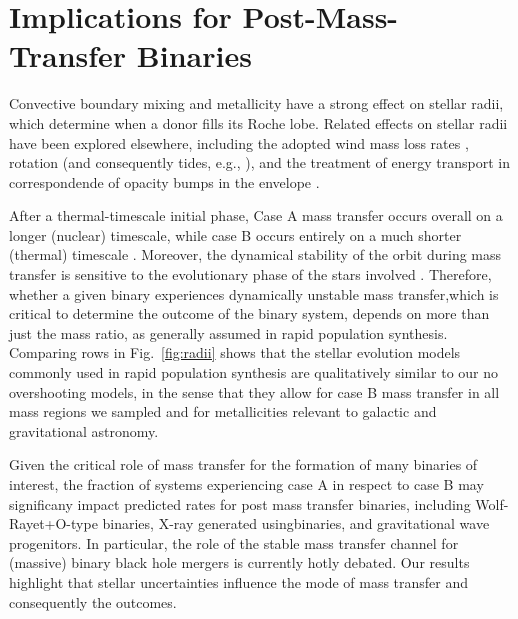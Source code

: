 \documentclass[twocolumn]{aastex63}
\DeclareRobustCommand{\Figref}[1]{Fig.~\ref{#1}}
\begin{document}
\section{Implications for Post-Mass-Transfer Binaries}

Convective boundary mixing \citep{brott:11, johnston:24} and
metallicity have a strong effect on stellar radii, which determine
when a donor fills its Roche lobe. Related effects on stellar radii have
been explored elsewhere, including the adopted wind mass loss rates
\citep[e.g.,][]{smith:14, renzo:17, josiek:24}, rotation (and
consequently tides, e.g., \citealt{maeder:00}), and the treatment of energy transport
in correspondende of opacity bumps in the envelope
\citep[e.g.,][]{joss:73, agrawal:22, cheng:24}.

After a thermal-timescale initial phase, Case A mass transfer occurs
overall on a longer (nuclear) timescale, while case B occurs entirely
on a much shorter (thermal) timescale \citep[but see][]{klencki:22}.
Moreover, the dynamical stability of the orbit during mass transfer is
sensitive to the evolutionary phase of the stars involved
\citep[e.g.,][]{claeys:14}. Therefore, whether a given binary
experiences dynamically unstable mass transfer,which is critical to determine
the outcome of the binary system, depends on more than just the mass
ratio, as generally assumed in rapid population synthesis. Comparing
rows in \Figref{fig:radii} shows that the stellar evolution models
commonly used in rapid population synthesis are qualitatively similar
to our no overshooting models, in the sense that they allow for case B
mass transfer in all mass regions we sampled and for metallicities
relevant to galactic and gravitational astronomy.

Given the critical role of mass transfer for the formation of many
binaries of interest, the fraction of systems experiencing case A in
respect to case B may significany impact predicted rates for post mass
transfer binaries, including Wolf-Rayet+O-type binaries, X-ray
generated usingbinaries, and gravitational wave progenitors. In
particular, the role of the stable mass transfer channel
\citep[e.g.,][]{marchant:21, vanson:22} for (massive) binary black
hole mergers is currently hotly debated. Our results highlight that
stellar uncertainties influence the mode of mass transfer and
consequently the outcomes.




\end{document}

